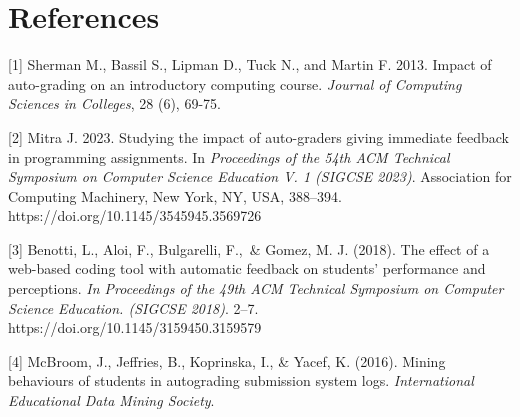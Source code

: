 \documentclass{article}
\begin{document}
\newpage

\section*{References}


{
\small

[1] Sherman M., Bassil S., Lipman D., Tuck N., and Martin F. 2013. Impact of auto-grading on an introductory computing course. \textit{Journal of Computing Sciences in Colleges}, 28 (6),
69-75.

[2] Mitra J. 2023. Studying the impact of auto-graders giving immediate feedback in programming assignments. In \textit{Proceedings of the 54th ACM Technical Symposium on Computer Science Education V. 1 (SIGCSE 2023)}. Association for Computing Machinery, New York, NY, USA, 388–394. https://doi.org/10.1145/3545945.3569726

[3] Benotti, L., Aloi, F., Bulgarelli, F.,\ \& Gomez, M. J. (2018). The effect of a web-based coding tool with automatic feedback on students’ performance and perceptions. \textit{‌In Proceedings of the 49th ACM Technical Symposium on Computer Science Education. (SIGCSE 2018)}. 2–7. https://doi.org/10.1145/3159450.3159579

[4] McBroom, J., Jeffries, B., Koprinska, I., \& Yacef, K. (2016). Mining behaviours of students in autograding submission system logs. \textit{International Educational Data Mining Society}.
}



\end{document}
